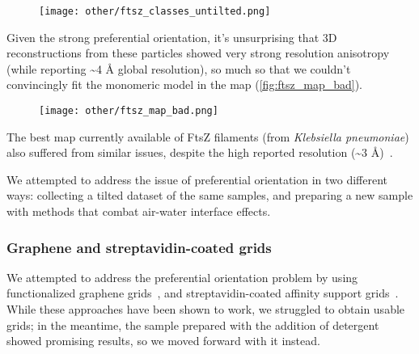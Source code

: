 \begin{figure}[ht]
    \centering
    \texttt{[image: other/ftsz\_classes\_untilted.png]}
    \label{fig:ftsz_classes}
\end{figure}

Given the strong preferential orientation, it's unsurprising that 3D reconstructions from these particles showed very strong resolution anisotropy (while reporting \sim4 Å global resolution), so much so that we couldn't convincingly fit the monomeric model in the map (\autoref{fig:ftsz_map_bad}).

\begin{figure}[ht]
    \centering
    \texttt{[image: other/ftsz\_map\_bad.png]}
    \label{fig:ftsz_map_bad}
\end{figure}

The best map currently available of FtsZ filaments (from \textit{Klebsiella pneumoniae}) also suffered from similar issues, despite the high reported resolution (\sim3 Å)~\cite{fujitaStructuresFtsZSingle2023}.

We attempted to address the issue of preferential orientation in two different ways: collecting a tilted dataset of the same samples, and preparing a new sample with methods that combat air-water interface effects.

\subsubsection{Graphene and streptavidin-coated grids}

We attempted to address the preferential orientation problem by using functionalized graphene grids~\cite{luFunctionalizedGrapheneGrids2022}, and streptavidin-coated affinity support grids~\cite{crucifixImmobilizationBiotinylatedDNA2004,hanLongShelflifeStreptavidin2016}.
While these approaches have been shown to work, we struggled to obtain usable grids; in the meantime, the sample prepared with the addition of detergent showed promising results, so we moved forward with it instead.

